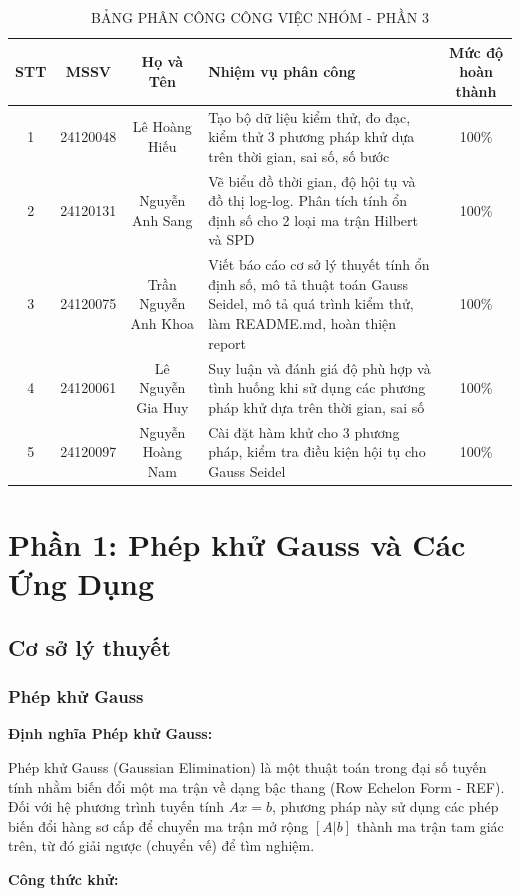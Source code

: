 \documentclass[a4paper]{article}
\begin{document}
\begin{table}[H]
\centering
\begin{tabular}{|c|c|c|m{6cm}|c|}
\hline
\textbf{STT} & \textbf{MSSV} & \textbf{Họ và Tên} & \textbf{Nhiệm vụ phân công} & \textbf{Mức độ hoàn thành} \\ \hline
1 & 24120048 & Lê Hoàng Hiếu & Tạo bộ dữ liệu kiểm thử, đo đạc, kiểm thử 3 phương pháp khử dựa trên thời gian, sai số, số bước & 100\% \\ \hline
2 & 24120131 & Nguyễn Anh Sang & Vẽ biểu đồ thời gian, độ hội tụ và đồ thị log-log. Phân tích tính ổn định số cho 2 loại ma trận Hilbert và SPD& 100\% \\ \hline
3 & 24120075 & Trần Nguyễn Anh Khoa & Viết báo cáo cơ sở lý thuyết tính ổn định số, mô tả thuật toán Gauss Seidel, mô tả quá trình kiểm thử, làm README.md, hoàn thiện report & 100\% \\ \hline
4 & 24120061 & Lê Nguyễn Gia Huy & Suy luận và đánh giá độ phù hợp và tình huống khi sử dụng các phương pháp khử dựa trên thời gian, sai số & 100\% \\ \hline
5 & 24120097 & Nguyễn Hoàng Nam & Cài đặt hàm khử cho 3 phương pháp, kiểm tra điều kiện hội tụ cho Gauss Seidel & 100\% \\ \hline
\end{tabular}
\caption{BẢNG PHÂN CÔNG CÔNG VIỆC NHÓM - PHẦN 3}
\end{table}

\section{Phần 1: Phép khử Gauss và Các Ứng Dụng}
\subsection{Cơ sở lý thuyết}
\subsubsection{Phép khử Gauss}
\textbf{Định nghĩa Phép khử Gauss:}

Phép khử Gauss (Gaussian Elimination) là một thuật toán trong đại số tuyến tính nhằm biến đổi một ma trận về dạng bậc thang (Row Echelon Form - REF). Đối với hệ phương trình tuyến tính $Ax = b$, phương pháp này sử dụng các phép biến đổi hàng sơ cấp để chuyển ma trận mở rộng $[A|b]$ thành ma trận tam giác trên, từ đó giải ngược (chuyển vế) để tìm nghiệm.

\textbf{Công thức khử:} 
\end{document}

